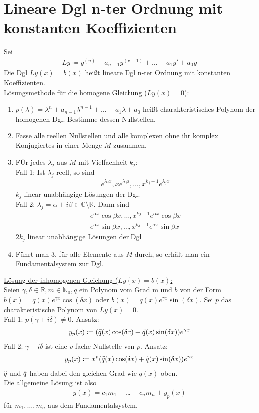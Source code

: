 \section{Lineare Dgl n-ter Ordnung mit konstanten Koeffizienten}
Sei 
\begin{align*}
    Ly \coloneqq y^{(n)} + a_{n-1}y^{(n-1)}+ \ldots + a_1y' + a_0y
\end{align*}
Die Dgl $Ly(x)=b(x)$ heißt lineare Dgl n-ter Ordnung mit konstanten Koeffizienten. \\
Lösungsmethode für die homogene Gleichung ($Ly(x)=0$):
\begin{enumerate}
    \item $p(\lambda)=\lambda^n + a_{n-1}\lambda^{n-1} + \ldots + a_1\lambda + a_0$ heißt charakteristisches Polynom der homogenen Dgl.
    Bestimme dessen Nullstellen.
    \item Fasse alle reellen Nullstellen und alle komplexen ohne ihr komplex Konjugiertes in einer Menge $M$ zusammen.
    \item FÜr jedes $\lambda_j$ aus $M$ mit Vielfachheit $k_j$: \\
    Fall 1: Ist $\lambda_j$ reell, so sind
    \begin{align*}
        e^{\lambda_jx}, xe^{\lambda_jx}, \ldots, x^{k_j-1}e^{\lambda_jx}
    \end{align*}
    $k_j$ linear unabhängige Lösungen der Dgl. \\
    Fall 2: $\lambda_j = \alpha+i\beta \in \mathbb{C} \setminus \mathbb{R}$. Dann sind
    \begin{align*}
        e^{\alpha x}\cos \beta x, \ldots, x^{kj-1}e^{\alpha x}\cos \beta x \\
        e^{\alpha x}\sin \beta x, \ldots, x^{kj-1}e^{\alpha x}\sin \beta x
    \end{align*}
    $2k_j$ linear unabhängige Lösungen der Dgl
    \item Führt man 3. für alle Elemente aus $M$ durch, so erhält man ein Fundamentalsystem zur Dgl.
\end{enumerate}
\underline{Lösung der inhomogenen Gleichung ($Ly(x)=b(x)$:} \\
Seien $\gamma,\delta \in \mathbb{R}, m \in \mathbb{N}_0,q$ ein Polynom vom Grad m und $b$ von der Form $b(x)=q(x)e^{\gamma x}\cos(\delta x)$
oder $b(x)=q(x)e^{\gamma x}\sin(\delta x)$. Sei $p$ das charakteristische Polynom von $Ly(x)=0$. \\
Fall 1: $p(\gamma + i\delta) \neq 0$. Ansatz:
\begin{align*}
    y_p(x) \coloneqq (\widehat{q}(x)\cos(\delta x) + \Tilde{q}(x)\sin(\delta x))e^{\gamma x}
\end{align*}
Fall 2: $\gamma + i \delta$ ist eine $v$-fache Nullstelle von $p$. Ansatz:
\begin{align*}
    y_p(x) \coloneqq x^v(\widehat{q}(x)\cos(\delta x) + \Tilde{q}(x) \sin(\delta x))e^{\gamma x}
\end{align*}
$\widehat{q}$ und $\Tilde{q}$ haben dabei den gleichen Grad wie $q(x)$ oben. \\
Die allgemeine Lösung ist also
\begin{align*}
    y(x) = c_1m_1 + \ldots + c_nm_n + y_p(x)
\end{align*}
für $m_1, \ldots, m_n$ aus dem Fundamentalsystem.